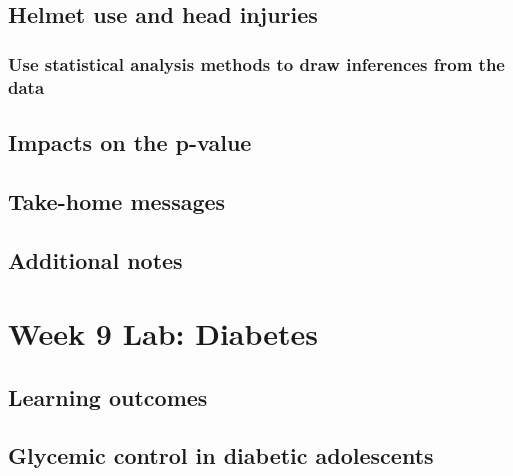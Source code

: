 \documentclass[
]{report}
\begin{document}
\hypertarget{helmet-use-and-head-injuries}{%
\subsection{Helmet use and head injuries}\label{helmet-use-and-head-injuries}}

\hypertarget{use-statistical-analysis-methods-to-draw-inferences-from-the-data-3}{%
\subsubsection*{Use statistical analysis methods to draw inferences from the data}\label{use-statistical-analysis-methods-to-draw-inferences-from-the-data-3}}

\hypertarget{impacts-on-the-p-value}{%
\subsection*{Impacts on the p-value}\label{impacts-on-the-p-value}}

\hypertarget{take-home-messages-16}{%
\subsection{Take-home messages}\label{take-home-messages-16}}

\hypertarget{additional-notes-15}{%
\subsection{Additional notes}\label{additional-notes-15}}

\hypertarget{week-9-lab-diabetes}{%
\section{Week 9 Lab: Diabetes}\label{week-9-lab-diabetes}}

\hypertarget{learning-outcomes-19}{%
\subsection{Learning outcomes}\label{learning-outcomes-19}}

\hypertarget{glycemic-control-in-diabetic-adolescents}{%
\subsection{Glycemic control in diabetic adolescents}\label{glycemic-control-in-diabetic-adolescents}}
\end{document}
